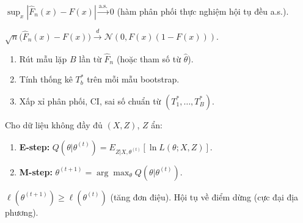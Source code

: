 \documentclass[12pt,a4paper]{article}
\begin{document}
\begin{dinhly}[title={Định lý Glivenko--Cantelli}]
  $\sup_x |\hat{F}_n(x) - F(x)| \xrightarrow{\text{a.s.}} 0$ (hàm phân phối thực nghiệm hội tụ đều a.s.).
\end{dinhly}

\begin{dinhly}[title={Hệ quả CLT cho $\hat{F}_n$}]
  $\sqrt{n}\bigl(\hat{F}_n(x) - F(x)\bigr) \xrightarrow{d} \mathcal{N}\!\left(0, F(x)(1-F(x))\right)$.
\end{dinhly}

\begin{phuongphap}[title={Bootstrap}]
  \begin{enumerate}
    \item Rút mẫu lặp $B$ lần từ $\hat{F}_n$ (hoặc tham số từ $\hat{\theta}$).
    \item Tính thống kê $T^*_b$ trên mỗi mẫu bootstrap.
    \item Xấp xỉ phân phối, CI, sai số chuẩn từ $(T^*_1, \ldots, T^*_B)$.
  \end{enumerate}
\end{phuongphap}

\begin{phuongphap}[title={Phương pháp EM (Expectation--Maximization)}]
  Cho dữ liệu không đầy đủ $(X, Z)$, $Z$ ẩn:
  \begin{enumerate}
    \item \textbf{E-step:} $Q(\theta|\theta^{(t)}) = E_{Z|X,\theta^{(t)}}[\ln L(\theta; X, Z)]$.
    \item \textbf{M-step:} $\theta^{(t+1)} = \arg\max_\theta Q(\theta|\theta^{(t)})$.
  \end{enumerate}
  $\ell(\theta^{(t+1)}) \ge \ell(\theta^{(t)})$ (tăng đơn điệu). Hội tụ về điểm dừng (cực đại địa phương).
\end{phuongphap}
\end{document}

